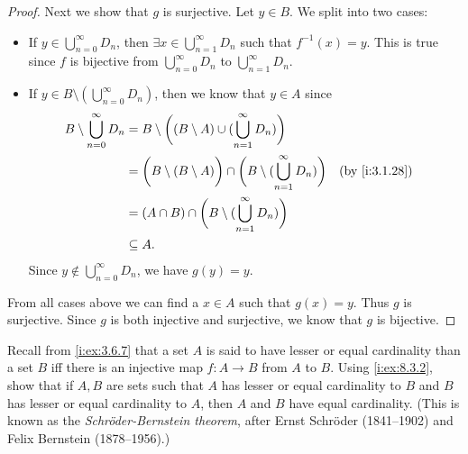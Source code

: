 \begin{proof}
  Next we show that \(g\) is surjective.
  Let \(y \in B\).
  We split into two cases:
  \begin{itemize}
    \item If \(y \in \bigcup_{n = 0}^\infty D_n\), then \(\exists x \in \bigcup_{n = 1}^\infty D_n\) such that \(f^{-1}(x) = y\).
          This is true since \(f\) is bijective from \(\bigcup_{n = 0}^\infty D_n\) to \(\bigcup_{n = 1}^\infty D_n\).
    \item If \(y \in B \setminus (\bigcup_{n = 0}^\infty D_n)\), then we know that \(y \in A\) since
          \begin{align*}
            B \setminus \bigcup_{n = 0}^\infty D_n & = B \setminus \bigg((B \setminus A) \cup (\bigcup_{n = 1}^\infty D_n)\bigg)                                            \\
                                                   & = \bigg(B \setminus (B \setminus A)\bigg) \cap \bigg(B \setminus (\bigcup_{n = 1}^\infty D_n)\bigg) &  & \by{i:3.1.28} \\
                                                   & = (A \cap B) \cap \bigg(B \setminus (\bigcup_{n = 1}^\infty D_n)\bigg)                                                 \\
                                                   & \subseteq A.
          \end{align*}
          Since \(y \notin \bigcup_{n = 0}^\infty D_n\), we have \(g(y) = y\).
  \end{itemize}
  From all cases above we can find a \(x \in A\) such that \(g(x) = y\).
  Thus \(g\) is surjective.
  Since \(g\) is both injective and surjective, we know that \(g\) is bijective.
\end{proof}

\begin{ex}\label{i:ex:8.3.3}
  Recall from \cref{i:ex:3.6.7} that a set \(A\) is said to have lesser or equal cardinality than a set \(B\) iff there is an injective map \(f : A \to B\) from \(A\) to \(B\).
  Using \cref{i:ex:8.3.2}, show that if \(A, B\) are sets such that \(A\) has lesser or equal cardinality to \(B\) and \(B\) has lesser or equal cardinality to \(A\), then \(A\) and \(B\) have equal cardinality.
  (This is known as the \emph{Schröder-Bernstein theorem}, after Ernst Schröder (1841--1902) and Felix Bernstein (1878--1956).)
\end{ex}

